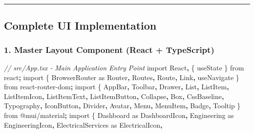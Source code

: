 \documentclass[
]{article}
\newenvironment{Shaded}{\begin{snugshade}}{\end{snugshade}}
\newcommand{\CommentTok}[1]{\textcolor[rgb]{0.56,0.35,0.01}{\textit{#1}}}
\newcommand{\ImportTok}[1]{#1}
\newcommand{\NormalTok}[1]{#1}
\newcommand{\OperatorTok}[1]{\textcolor[rgb]{0.81,0.36,0.00}{\textbf{#1}}}
\newcommand{\StringTok}[1]{\textcolor[rgb]{0.31,0.60,0.02}{#1}}
\begin{document}
\begin{center}\rule{0.5\linewidth}{0.5pt}\end{center}

\hypertarget{complete-ui-implementation}{%
\subsection{Complete UI
Implementation}\label{complete-ui-implementation}}

\hypertarget{master-layout-component-react-typescript}{%
\subsubsection{1. Master Layout Component (React +
TypeScript)}\label{master-layout-component-react-typescript}}

\begin{Shaded}
\begin{Highlighting}[]
\CommentTok{// src/App.tsx {-} Main Application Entry Point}
\ImportTok{import}\NormalTok{ React}\OperatorTok{,}\NormalTok{ \{ useState \} }\ImportTok{from} \StringTok{\textquotesingle{}react\textquotesingle{}}\OperatorTok{;}
\ImportTok{import}\NormalTok{ \{ BrowserRouter }\ImportTok{as}\NormalTok{ Router}\OperatorTok{,}\NormalTok{ Routes}\OperatorTok{,}\NormalTok{ Route}\OperatorTok{,}\NormalTok{ Link}\OperatorTok{,}\NormalTok{ useNavigate \} }\ImportTok{from} \StringTok{\textquotesingle{}react{-}router{-}dom\textquotesingle{}}\OperatorTok{;}
\ImportTok{import}\NormalTok{ \{}
\NormalTok{  AppBar}\OperatorTok{,}\NormalTok{ Toolbar}\OperatorTok{,}\NormalTok{ Drawer}\OperatorTok{,}\NormalTok{ List}\OperatorTok{,}\NormalTok{ ListItem}\OperatorTok{,}\NormalTok{ ListItemIcon}\OperatorTok{,}\NormalTok{ ListItemText}\OperatorTok{,}
\NormalTok{  ListItemButton}\OperatorTok{,}\NormalTok{ Collapse}\OperatorTok{,}\NormalTok{ Box}\OperatorTok{,}\NormalTok{ CssBaseline}\OperatorTok{,}\NormalTok{ Typography}\OperatorTok{,}\NormalTok{ IconButton}\OperatorTok{,}
\NormalTok{  Divider}\OperatorTok{,}\NormalTok{ Avatar}\OperatorTok{,}\NormalTok{ Menu}\OperatorTok{,}\NormalTok{ MenuItem}\OperatorTok{,}\NormalTok{ Badge}\OperatorTok{,}\NormalTok{ Tooltip}
\NormalTok{\} }\ImportTok{from} \StringTok{\textquotesingle{}@mui/material\textquotesingle{}}\OperatorTok{;}
\ImportTok{import}\NormalTok{ \{}
\NormalTok{  Dashboard }\ImportTok{as}\NormalTok{ DashboardIcon}\OperatorTok{,}
\NormalTok{  Engineering }\ImportTok{as}\NormalTok{ EngineeringIcon}\OperatorTok{,}
\NormalTok{  ElectricalServices }\ImportTok{as}\NormalTok{ ElectricalIcon}\OperatorTok{,}

\end{Highlighting}
\end{Shaded}
\end{document}
